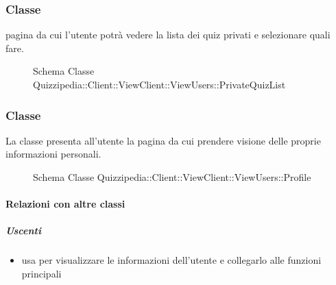\subsubsection{Classe }
pagina da cui l'utente potrà vedere la lista dei quiz privati e selezionare quali fare.
\begin{figure}[H]
\centering
\noindent{}
\caption[Schema Classe PrivateQuizList]{Schema Classe Quizzipedia::Client::ViewClient::ViewUsers::PrivateQuizList}
\end{figure}
\subsubsection{Classe }
La classe presenta all'utente la pagina da cui prendere visione delle proprie informazioni personali.
\begin{figure}[H]
\centering
\noindent{}
\caption[Schema Classe Profile]{Schema Classe Quizzipedia::Client::ViewClient::ViewUsers::Profile}
\end{figure}
\paragraph{Relazioni con altre classi}
\subparagraph{Uscenti}
\begin{itemize}
\item usa  per visualizzare le informazioni dell'utente e collegarlo alle funzioni principali
\end{itemize}
